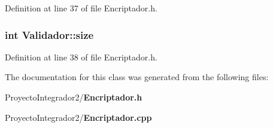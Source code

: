 Definition at line 37 of file Encriptador.\-h.

\subsubsection[{size}]{\setlength{\rightskip}{0pt plus 5cm}int Validador\-::size}\label{class_validador_a34374bc7f9d8ffac55db94a6325e41bd}


Definition at line 38 of file Encriptador.\-h.



The documentation for this class was generated from the following files\-:\begin{DoxyCompactItemize}
\item 
Proyecto\-Integrador2/{\bf Encriptador.\-h}\item 
Proyecto\-Integrador2/{\bf Encriptador.\-cpp}\end{DoxyCompactItemize}
